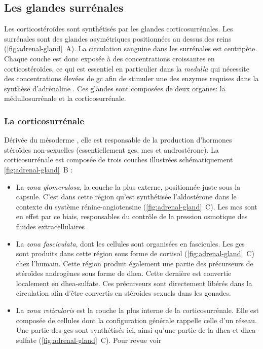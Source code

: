 \documentclass[../main.tex]{subfiles}
\begin{document}

\subsection{Les glandes surrénales}
	Les corticostéroïdes sont synthétisés par les glandes corticosurrénales.
	Les surrénales sont des glandes asymétriques positionnées au dessus des reins (\autoref{fig:adrenal-gland}~A).
	La circulation sanguine dans les surrénales est centripète.
	Chaque couche est donc exposée à des concentrations croissantes en corticostéroïdes, ce qui est essentiel en particulier dans la \textit{medulla} qui nécessite des concentrations élevées de \gls{gc} afin de stimuler une des enzymes requises dans la synthèse d'adrénaline \citep{Nussey2001}.
	Ces glandes sont composées de deux organes: la médullosurrénale et la corticosurrénale.

	

	\subsubsection{La corticosurrénale}
		Dérivée du mésoderme \citep{Hammer2005}, elle est responsable de la production d'hormones stéroïdes non-sexuelles (essentiellement \glspl{gc}, \glspl{mc} et androstérone).
		La corticosurrénale est composée de trois couches illustrées schématiquement \autoref{fig:adrenal-gland}~B \citep{Charlton1990,Parker1993} :
		\begin{itemize}
			\item
				La \textit{zona glomerulosa}, la couche la plus externe, positionnée juste sous la capsule.
				C'est dans cette région qu'est synthétisée l'aldostérone dans le contexte du système rénine-angiotensine (\autoref{fig:adrenal-gland}~C).
				Les \glspl{mc} sont en effet par ce biais, responsables du contrôle de la pression osmotique des fluides extracellulaires \citep{Feraco2013}.
			\item
				La \textit{zona fasciculata}, dont les cellules sont organisées en fascicules. Les \glspl{gc} sont produits dans cette région sous forme de cortisol (\autoref{fig:adrenal-gland}~C) chez l'humain.
				Cette région produit également une partie des précurseurs de stéroïdes androgènes sous forme de \gls{dhea}.
				Cette dernière est convertie localement en \gls{dhea}-sulfate.
				Ces précurseurs sont directement libérés dans la circulation afin d'être convertis en stéroides sexuels dans les gonades.
			\item
				La \textit{zona reticularis} est la couche la plus interne de la corticosurrénale.
				Elle est composée de cellules dont la configuration générale rappelle celle d'un réseau.
				Une partie des \glspl{gc} sont synthétisés ici, ainsi qu'une partie de la \gls{dhea} et \gls{dhea}-sulfate (\autoref{fig:adrenal-gland}~C).
				Pour revue voir \citep{McKay2003a}
		\end{itemize}
\end{document}
